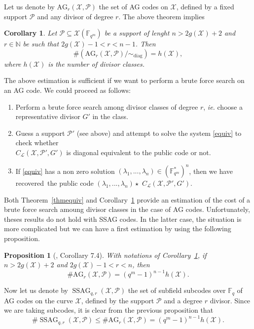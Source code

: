\documentclass[10pt]{article}
\newtheorem{prop1}[thm]{Proposition}
\newtheorem{coro1}[thm]{Corollary}
\theoremstyle{definition}
\theoremstyle{definition}
\theoremstyle{definition}
\newcommand{\N}{\mathbb{N}}
\newcommand{\Fqm}{\mathbb{F}_{q^m}}
\newcommand{\Fq}{\mathbb{F}_q}
\newcommand{\su}{\subseteq}
\newcommand{\X}{\mathcal{X}}
\newcommand{\PR}{\mathcal{P}}
\newcommand{\ssag}{\operatorname{SSAG}}
\newcommand{\calL}{\mathcal{L}}
\begin{document}
Let us denote by $\mathrm{AG}_r(\X,\PR)$ the set of AG codes on $\X$, defined by a fixed support $\PR$ and any divisor of degree $r$. The above theorem implies

\begin{coro1} \label{nbAGr}
Let $\PR \su \X(\Fqm)$ be a support of lenght $n > 2g(\X)+2$ and $r \in \N$ be such that $2g(\X)-1 < r < n-1$. Then 
\[ \#\left(\mathrm{AG}_r(\X,\PR)/ \sim_{\mathrm{diag}}\right)= h(\X),\]
where $h(\X)$ is the number of divisor classes.
\end{coro1}

The above estimation is sufficient if we want to perform a brute force search on an AG code. We could proceed as follows:
\begin{enumerate}
\item Perform a brute force search among divisor classes of degree $r$, \textit{ie.} choose a representative divisor $G'$ in the class.
\item Guess a support $\PR'$ (see above) and attempt to solve the system \eqref{equiv} to check whether \\ $C_{\calL}(\X,\PR',G')$ is diagonal equivalent to the public code or not.
\item If \eqref{equiv} has a non zero solution $(\lambda_1,...,\lambda_n) \in (\Fqm^*)^n$, then we have recovered~the public code $(\lambda_1,...,\lambda_n) \star$ $C_{\calL}(\X,\PR',G')$.
\end{enumerate}

Both Theorem~\ref{thmequiv} and Corollary~\ref{nbAGr} provide an estimation of the cost of a brute force search amoung divisor classes in the case of AG codes. Unfortunately,  theses results do not hold with SSAG codes. In the latter case, the situation is more complicated but we can have a first estimation by using the following proposition.

\begin{prop1}[\cite{CMRP}, Corollary 7.4] 
With notations of Corollary~\ref{nbAGr}, if $n>2g(\X)+2$ and $2g(\X)-1<r<n$, then 
\[\#\mathrm{AG}_r(\X,\PR) = (q^m-1)^{n-1}h(\X).\]
\end{prop1}

Now let us denote by $\ssag_{q,r}(\X,\PR)$ the set of subfield subcodes over $\Fq$ of AG codes on the curve $\X$, defined by the support $\PR$ and a degree $r$ divisor. Since we are taking subcodes, it is clear from the previous proposition that 
\[\#\ssag_{q,r}(\X,\PR) \leq \#\mathrm{AG}_r(\X,\PR) = (q^m-1)^{n-1}h(\X).\]
\end{document}
